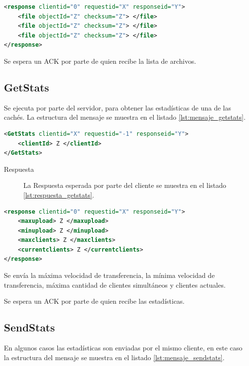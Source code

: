 \begin{lstlisting}[language=XML,caption={Mensaje de Respuesta de GetListOfFiles},label={lst:respuesta_getlistoffiles}]
<response clientid="0" requestid="X" responseid="Y"> 
	<file objectId="Z" checksum="Z"> </file>
	<file objectId="Z" checksum="Z"> </file>
	<file objectId="Z" checksum="Z"> </file>
</response>
\end{lstlisting}

Se espera un ACK por parte de quien recibe la lista de archivos.

\subsection{GetStats}
Se ejecuta por parte del servidor, para obtener las estadísticas de una de las cachés. La estructura del mensaje se muestra en el listado \ref{lst:mensaje_getstats}.

\begin{lstlisting}[language=XML,caption={Mensaje de GetStats},label={lst:mensaje_getstats}]
<GetStats clientid="X" requestid="-1" responseid="Y"> 
	<clientId> Z </clientId>
</GetStats>
\end{lstlisting}



\begin{description}
\item[Respuesta] La Respuesta esperada por parte del cliente se muestra en el listado \ref{lst:respuesta_getstats}.
\end{description}

\begin{lstlisting}[language=XML,caption={Mensaje de Respuesta de GetStats},label={lst:respuesta_getstats}]
<response clientid="0" requestid="X" responseid="Y"> 
	<maxupload> Z </maxupload>
	<minupload> Z </minupload>
	<maxclients> Z </maxclients>
	<currentclients> Z </currentclients>
</response>
\end{lstlisting}

Se envía la máxima velocidad de transferencia, la mínima velocidad de transferencia, máxima cantidad de clientes simultáneos y clientes actuales.

Se espera un ACK por parte de quien recibe las estadísticas.

\subsection{SendStats}

En algunos casos las estadísticas son enviadas por el mismo cliente, en este caso la estructura del mensaje se muestra en el listado \ref{lst:mensaje_sendstats}.

